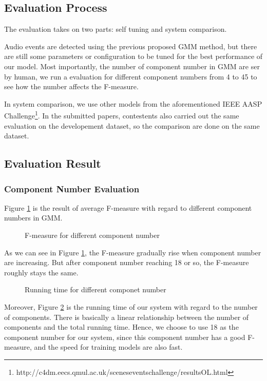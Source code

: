 \subsection{Evaluation Process}
The evaluation takes on two parts: self tuning and system comparison. 

Audio events are detected using the previous proposed GMM method, but there are still some parameters or configuration to be tuned for the best performance of our model.
Most importantly, the number of component number in GMM are ser by human, we run a evaluation for different component numbers from 4 to 45 to see how the number affects the F-measure. 

In system comparison, we use other models from the aforementioned IEEE AASP Challenge\footnote{http://c4dm.eecs.qmul.ac.uk/sceneseventschallenge/resultsOL.html}. 
In the submitted papers, contestents also carried out the same evaluation on the developement dataset, so the comparison are done on the same dataset.  

\subsection{Evaluation Result}
\subsubsection{Component Number Evaluation}
Figure \ref{fig:component} is the result of average F-measure with regard to different component numbers in GMM. 
\begin{figure}[htb!]
\centering

\caption{F-measure for different component number}
\label{fig:component}
\end{figure}

As we can see in Figure \ref{fig:component}, the F-measure gradually rise when component number are increasing. 
But after component number reaching 18 or so, the F-measure roughly stays the same.  

\begin{figure}[htb!]
\centering

\caption{Running time for different componet number}
\label{fig:componentTime}
\end{figure}
Moreover, Figure \ref{fig:componentTime} is the running time of our system with regard to the number of components. 
There is basically a linear relationship between the number of components and the total running time. 
Hence, we choose to use 18 as the component number for our system, since this component number has a good F-measure, and the speed for training models are also fast.

